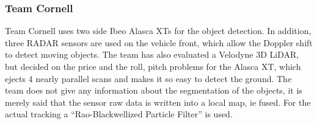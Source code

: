 \documentclass[11pt,oneside,openright]{mpreport}
\begin{document}
\subsubsection{Team Cornell}
Team Cornell \cite{Campbell2007} uses two side Ibeo Alasca XTs for the object detection. In addition, three RADAR sensors are used on the vehicle front, 
which allow the Doppler shift to detect moving objects. The team has also evaluated a Velodyne 3D LiDAR, but decided on the price and the roll, pitch problems
for the Alasca XT, which ejects 4 nearly parallel scans and makes it so easy to detect the ground. The team does not give any information about the
segmentation of the objects, it is merely said that the sensor raw data is written into a local map, ie fused. For the actual tracking a 
``Rao-Blackwellized Particle Filter'' \cite{miller2007rao} is used.
\end{document}
